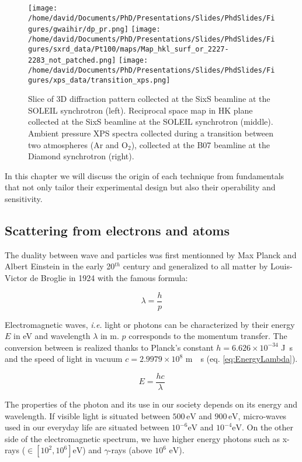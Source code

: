 \begin{figure}[!htb]
    \centering
    \texttt{[image: /home/david/Documents/PhD/Presentations/Slides/PhdSlides/Figures/gwaihir/dp\_pr.png]}
    \texttt{[image: /home/david/Documents/PhD/Presentations/Slides/PhdSlides/Figures/sxrd\_data/Pt100/maps/Map\_hkl\_surf\_or\_2227-2283\_not\_patched.png]}
    \texttt{[image: /home/david/Documents/PhD/Presentations/Slides/PhdSlides/Figures/xps\_data/transition\_xps.png]}
    \caption{Slice of 3D diffraction pattern collected at the SixS beamline at the SOLEIL synchrotron (left). Reciprocal space map in HK plane collected at the SixS beamline at the SOLEIL synchrotron (middle). Ambient pressure XPS spectra collected during a transition between two atmospheres (Ar and O$_2$), collected at the B07 beamline at the Diamond synchrotron (right).}
\end{figure}

In this chapter we will discuss the origin of each technique from fundamentals that not only tailor their experimental design but also their operability and sensitivity.

\subsection{Scattering from electrons and atoms}

The duality between wave and particles was first mentionned by Max Planck and Albert Einstein in the early 20$^{th}$ century and generalized to all matter by Louis-Victor de Broglie in 1924 with the famous formula:

\begin{equation}
	\lambda = \frac{h}{p}
\end{equation}

Electromagnetic waves, \textit{i.e.} light or photons can be characterized by their energy $E$ in \si{\electronvolt} and wavelength $\lambda$ in \si{\meter}. $p$ corresponds to the momentum transfer.
The conversion between is realized thanks to Planck's constant $h = 6.626 \times 10^{-34}$ \si{\joule.\second} and the speed of light in vacuum $c = 2.9979 \times 10^{8}$ \si{\meter.\per \second} (eq. \ref{eq:EnergyLambda}).

\begin{equation}
    \label{eq:EnergyLambda}
	E = \frac{hc}{\lambda}
\end{equation}

The properties of the photon and its use in our society depends on its energy and wavelength.
If visible light is situated between $500 \, \si{\electronvolt}$ and $900 \, \si{\electronvolt}$, micro-waves used in our everyday life are situated between $10^{-6} \si{\electronvolt}$ and $10^{-4}\si{\electronvolt}$.
On the other side of the electromagnetic spectrum, we have higher energy photons such as x-rays ($\in [10^{2}, 10^{6}] \si{\electronvolt}$) and $\gamma$-rays (above $10^{6}$ $\si{\electronvolt}$).

